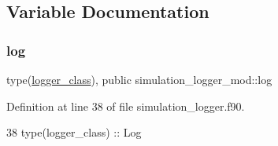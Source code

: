 \subsection{Variable Documentation}
\mbox{\label{namespacesimulation__logger__mod_aa778de9905350741e1f40bb04fdc1cf6}} 
\subsubsection{\texorpdfstring{log}{log}}
{\footnotesize\ttfamily type(\mbox{\hyperlink{structsimulation__logger__mod_1_1logger__class}{logger\+\_\+class}}), public simulation\+\_\+logger\+\_\+mod\+::log}



Definition at line 38 of file simulation\+\_\+logger.\+f90.


\begin{DoxyCode}
38     \textcolor{keywordtype}{type}(logger\_class) :: Log
\end{DoxyCode}
